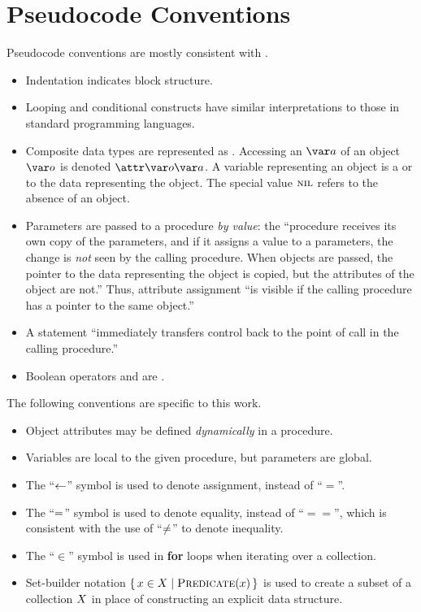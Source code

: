 \chapter{Pseudocode Conventions}\label{ch:pseudocode-conventions}

Pseudocode conventions are mostly consistent with \citet{Cormen2022}.
%
\begin{itemize}
    \item Indentation indicates block structure.
    \item Looping and conditional constructs have similar interpretations to those in standard programming languages.
    \item Composite data types are represented as . Accessing an  $\vSomeAttribute$ of an object $\vSomeObject$ is denoted
    $\aSomeObjectAttribute$. A variable representing an object is a  or  to the data representing the object. The special value
    $\textsc{nil}$ refers to the absence of an object.
    \item Parameters are passed to a procedure \emph{by value}: the ``procedure receives its own copy of the parameters, and if it assigns a value to a parameters, the change is \emph{not} seen by the calling procedure. When objects are passed, the pointer to the data representing the object is copied, but the attributes of the object are not.'' Thus, attribute assignment ``is visible if the calling procedure has a pointer to the same object.''
    \item A {\Return} statement ``immediately transfers control back to the point of call in the calling procedure.''
    \item Boolean operators {\AND} and {\OR} are .
\end{itemize}
%
The following conventions are specific to this work.
%
\begin{itemize}
    \item Object attributes may be defined \emph{dynamically} in a procedure.
    \item Variables are local to the given procedure, but parameters are global.
    \item The ``$\leftarrow$'' symbol is used to denote assignment, instead of ``$=$''.
    \item The ``$=$'' symbol is used to denote equality, instead of ``$==$'', which is consistent with the use of ``$\neq$'' to denote inequality.
    \item The ``$\in$'' symbol is used in \textbf{for} loops when iterating over a collection.
    \item Set-builder notation $\setBuilder{\vSomeElement \in \vSomeSet}{\cPredicate[\vSomeElement]}$ is used to create a subset of a collection $X$ in place of constructing an explicit data structure.
\end{itemize}